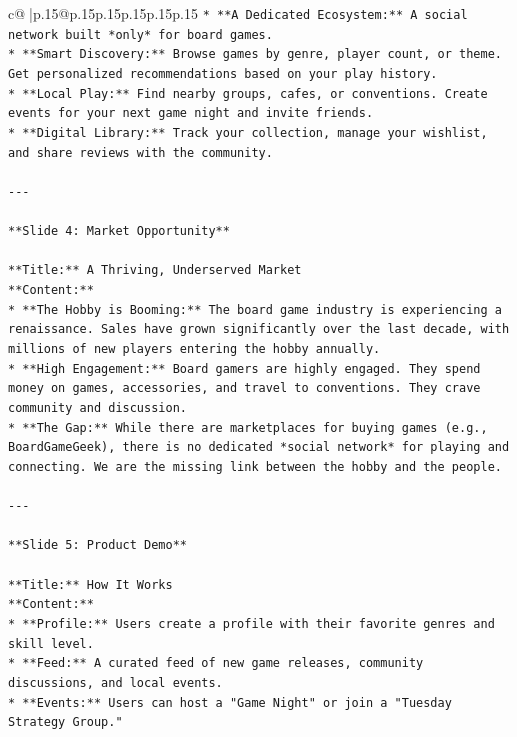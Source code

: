 \documentclass{article}
\begin{document}
{\begin{supertabular}{c@{$\;$}|p{.15\linewidth}@{}p{.15\linewidth}p{.15\linewidth}p{.15\linewidth}p{.15\linewidth}p{.15\linewidth}}
{{{\texttt{*   **A Dedicated Ecosystem:** A social network built *only* for board games.} \\
\texttt{*   **Smart Discovery:** Browse games by genre, player count, or theme. Get personalized recommendations based on your play history.} \\
\texttt{*   **Local Play:** Find nearby groups, cafes, or conventions. Create events for your next game night and invite friends.} \\
\texttt{*   **Digital Library:** Track your collection, manage your wishlist, and share reviews with the community.} \\
\\ 
\texttt{{-}{-}{-}} \\
\\ 
\texttt{**Slide 4: Market Opportunity**} \\
\\ 
\texttt{**Title:** A Thriving, Underserved Market} \\
\texttt{**Content:**} \\
\texttt{*   **The Hobby is Booming:** The board game industry is experiencing a renaissance. Sales have grown significantly over the last decade, with millions of new players entering the hobby annually.} \\
\texttt{*   **High Engagement:** Board gamers are highly engaged. They spend money on games, accessories, and travel to conventions. They crave community and discussion.} \\
\texttt{*   **The Gap:** While there are marketplaces for buying games (e.g., BoardGameGeek), there is no dedicated *social network* for playing and connecting. We are the missing link between the hobby and the people.} \\
\\ 
\texttt{{-}{-}{-}} \\
\\ 
\texttt{**Slide 5: Product Demo**} \\
\\ 
\texttt{**Title:** How It Works} \\
\texttt{**Content:**} \\
\texttt{*   **Profile:** Users create a profile with their favorite genres and skill level.} \\
\texttt{*   **Feed:** A curated feed of new game releases, community discussions, and local events.} \\
\texttt{*   **Events:** Users can host a "Game Night" or join a "Tuesday Strategy Group."} \\
}}}
\end{supertabular}}
\end{document}
